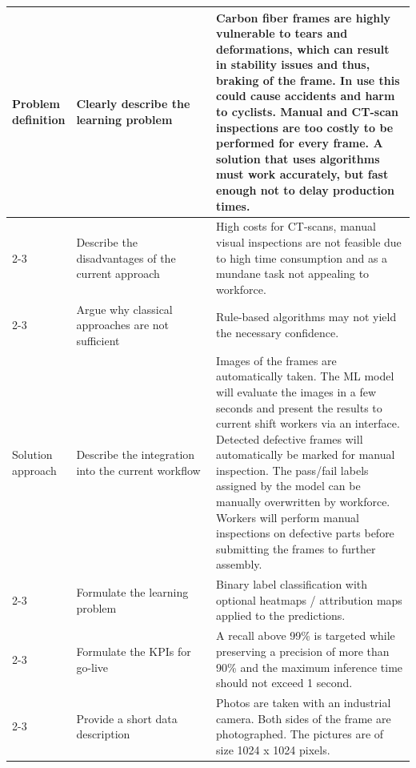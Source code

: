 {\begin{longtable}{p{0.15\linewidth}|p{0.35\linewidth}p{0.5\linewidth}}
    \hline
    Problem definition 
        & Clearly describe the learning problem  & Carbon fiber frames are highly vulnerable to tears and deformations, which can result in stability issues and thus, braking of the frame. In use this could cause accidents and harm to cyclists. Manual and CT-scan inspections are too costly to be performed for every frame. A solution that uses algorithms must work accurately, but fast enough not to delay production times. \\\cline{2-3}  
        \pagebreak
        \cline{2-3}  
        & Describe the disadvantages of the current approach & High costs for CT-scans, manual visual inspections are not feasible due to high time consumption and as a mundane task not appealing to workforce.\\\cline{2-3}  
        & Argue why classical approaches are not sufficient & Rule-based algorithms may not yield the necessary confidence. \\
        
    \hline
    Solution approach 
        & Describe the integration into the current workflow           & Images of the frames are automatically taken. The ML model will evaluate the images in a few seconds and present the results to current shift workers via an interface. Detected defective frames will automatically be marked for manual inspection. The pass/fail labels assigned by the model can  be manually overwritten by workforce. Workers will perform manual inspections on defective parts before submitting the frames to further assembly.\\\cline{2-3}  
        & Formulate the learning problem &  Binary label classification with optional heatmaps / attribution maps applied to the predictions.\\\cline{2-3} 
        & Formulate the KPIs for go-live & A recall above 99\% is targeted while preserving a precision of more than 90\% and the maximum inference time should not exceed 1 second.\\\cline{2-3}  
        & Provide a short data description & Photos are taken with an industrial camera. Both sides of the frame are photographed. The pictures are of size 1024 x 1024 pixels.\\
    \hline
\end{longtable}
} 


